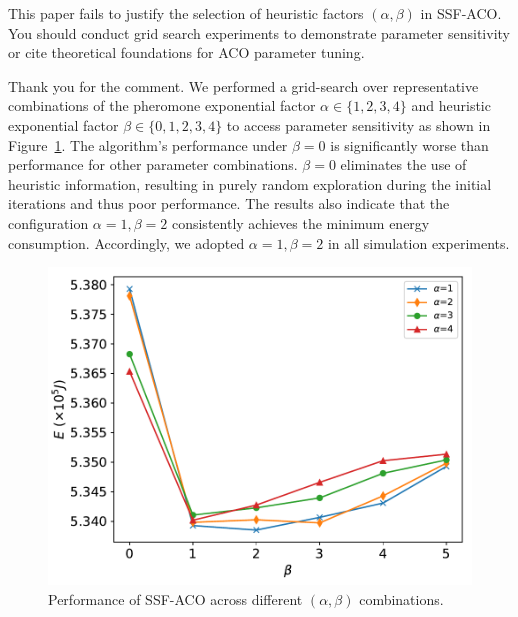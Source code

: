 \reviewer

\begin{revcomment}
	This paper fails to justify the selection of heuristic factors $(\alpha, \beta)$ in SSF-ACO. You should conduct grid search experiments to demonstrate parameter sensitivity or cite theoretical foundations for ACO parameter tuning.
\end{revcomment}
\begin{revresponse}
	Thank you for the comment.
	We performed a grid-search over representative combinations of the pheromone exponential factor $\alpha\in\{1,2,3,4\}$ and heuristic exponential factor $\beta\in\{0,1,2,3,4\}$ to access parameter sensitivity as shown in Figure~\ref{fig:cali}.
	The algorithm's performance under $\beta=0$ is significantly worse than performance for other parameter combinations. $\beta=0$ eliminates the use of heuristic information, resulting in purely random exploration during the initial iterations and thus poor performance.
	The results also indicate that the configuration $\alpha=1,\beta=2$ consistently achieves the minimum energy consumption. Accordingly, we adopted $\alpha=1,\beta=2$ in all simulation experiments.
	\begin{figure}[h]
		\centerline{\includegraphics[width=.5\textwidth]{fig/cali.pdf}}
		\caption{Performance of SSF-ACO across different $(\alpha,\beta)$ combinations.}
		\label{fig:cali}
	\end{figure}
\end{revresponse}

